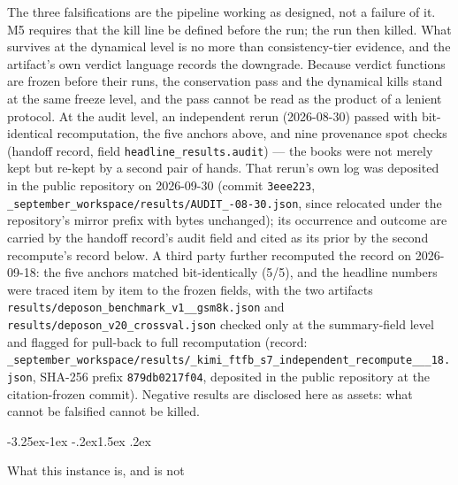 \documentclass[11pt,a4paper]{article}
\makeatletter
\renewcommand\subsection{\@startsection{subsection}{2}{\z@}%
  {-3.25ex\@plus -1ex \@minus -.2ex}{1.5ex \@plus .2ex}%
  {\normalfont\large\bfseries\raggedright}}
\makeatother
\begin{document}
The three falsifications are the pipeline working as designed, not a failure of it. M5 requires that the kill line be defined before the run; the run then killed. What survives at the dynamical level is no more than consistency-tier evidence, and the artifact's own verdict language records the downgrade. Because verdict functions are frozen before their runs, the conservation pass and the dynamical kills stand at the same freeze level, and the pass cannot be read as the product of a lenient protocol. At the audit level, an independent rerun (2026-08-30) passed with bit-identical recomputation, the five anchors above, and nine provenance spot checks (handoff record, field \texttt{headline\_\allowbreak results.audit}) — the books were not merely kept but re-kept by a second pair of hands. That rerun's own log was deposited in the public repository on 2026-09-30 (commit \texttt{3eee223}, \texttt{\_september\_\allowbreak workspace/\allowbreak results/\allowbreak AUDIT\_-08-30.json}, since relocated under the repository's mirror prefix with bytes unchanged); its occurrence and outcome are carried by the handoff record's audit field and cited as its prior by the second recompute's record below. A third party further recomputed the record on 2026-09-18: the five anchors matched bit-identically (5/5), and the headline numbers were traced item by item to the frozen fields, with the two artifacts \texttt{results/\allowbreak deposon\_\allowbreak benchmark\_\allowbreak v1\_\_\allowbreak gsm8k.json} and \texttt{results/\allowbreak deposon\_\allowbreak v20\_\allowbreak crossval.json} checked only at the summary-field level and flagged for pull-back to full recomputation (record: \texttt{\_september\_\allowbreak workspace/\allowbreak results/\allowbreak \_kimi\_\allowbreak ftfb\_\allowbreak s7\_\allowbreak independent\_\allowbreak recompute\_\_\_\allowbreak 18.json}, SHA-256 prefix \texttt{879db0217f04}, deposited in the public repository at the citation-frozen commit). Negative results are disclosed here as assets: what cannot be falsified cannot be killed.

\subsection{What this instance is, and is not}
\end{document}
